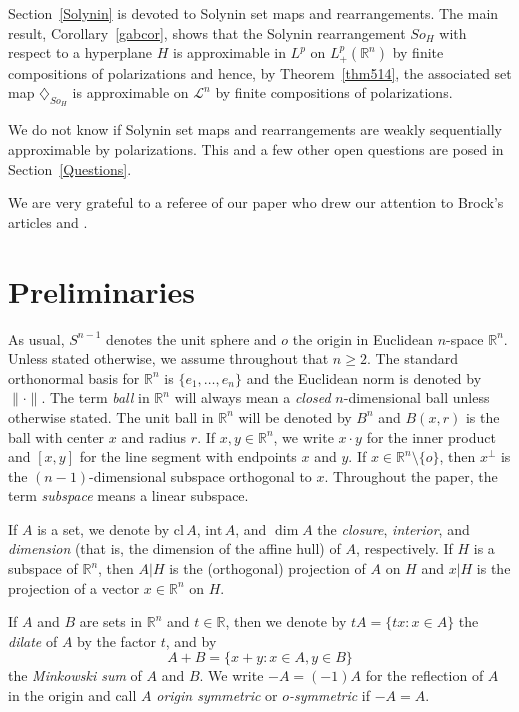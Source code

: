 \documentclass[12pt,reqno]{amsart}
\newcommand{\R}{{\mathbb R}}
\newcommand{\inte}{{\mathrm{int}}\,}
\newcommand{\cl}{{\mathrm{cl}}\,}
\newcommand{\di}{\diamondsuit}
\numberwithin{equation}{section}
\begin{document}
Section~\ref{Solynin} is devoted to Solynin set maps and rearrangements.  The main result, Corollary~\ref{gabcor}, shows that the Solynin rearrangement $So_H$ with respect to a hyperplane $H$ is approximable in $L^p$ on $L^p_+(\R^n)$ by finite compositions of polarizations and hence, by Theorem~\ref{thm514}, the associated set map $\di_{So_H}$ is approximable on ${\mathcal{L}}^n$ by finite compositions of polarizations.

We do not know if Solynin set maps and rearrangements are weakly sequentially approximable by polarizations.  This and a few other open questions are posed in Section~\ref{Questions}.

We are very grateful to a referee of our paper \cite{BGGK2} who drew our attention to Brock's articles \cite{Bro1} and \cite{Bro2}.


\section{Preliminaries}\label{subsec:notations}

As usual, $S^{n-1}$ denotes the unit sphere and $o$ the origin in Euclidean $n$-space $\R^n$.  Unless stated otherwise, we assume throughout that $n\ge 2$.   The standard orthonormal basis for $\R^n$ is $\{e_1,\dots,e_n\}$ and the Euclidean norm is denoted by $\|\cdot\|$.  The term {\em ball} in $\R^n$ will always mean a {\em closed} $n$-dimensional ball unless otherwise stated.  The unit ball in $\R^n$ will be denoted by $B^n$ and $B(x,r)$ is the ball with center $x$ and radius $r$.  If $x,y\in \R^n$, we write $x\cdot y$ for the inner product and $[x,y]$ for the line segment with endpoints $x$ and $y$. If $x\in \R^n\setminus\{o\}$, then $x^{\perp}$ is the $(n-1)$-dimensional subspace orthogonal to $x$. Throughout the paper, the term {\em subspace} means a linear subspace.

If $A$ is a set,  we denote by $\cl A$, $\inte A$, and $\dim A$ the {\it closure}, {\it interior}, and {\it dimension} (that is, the dimension of the affine hull) of $A$, respectively.  If $H$ is a subspace of $\R^n$, then $A|H$ is the (orthogonal) projection of $A$ on $H$ and $x|H$ is the projection of a vector $x\in \R^n$ on $H$.

If $A$ and $B$ are sets in $\R^n$ and $t\in \R$, then we denote by $tA=\{tx:x\in A\}$ the {\em dilate} of $A$ by the factor $t$, and by
$$A+B=\{x+y: x\in A, y\in B\}$$
the {\em Minkowski sum} of $A$ and $B$.  We write $-A=(-1)A$ for the reflection of $A$ in the origin and call $A$ {\em origin symmetric} or {\it $o$-symmetric} if $-A=A$.
\end{document}
